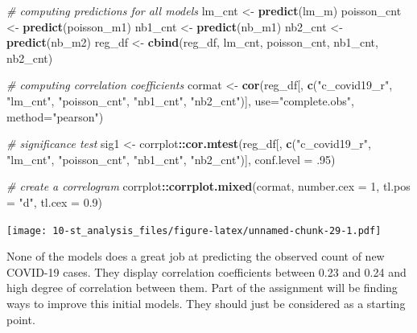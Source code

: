 \documentclass[
]{book}
\newenvironment{Shaded}{\begin{snugshade}}{\end{snugshade}}
\newcommand{\CommentTok}[1]{\textcolor[rgb]{0.56,0.35,0.01}{\textit{#1}}}
\newcommand{\DataTypeTok}[1]{\textcolor[rgb]{0.13,0.29,0.53}{#1}}
\newcommand{\DecValTok}[1]{\textcolor[rgb]{0.00,0.00,0.81}{#1}}
\newcommand{\FloatTok}[1]{\textcolor[rgb]{0.00,0.00,0.81}{#1}}
\newcommand{\KeywordTok}[1]{\textcolor[rgb]{0.13,0.29,0.53}{\textbf{#1}}}
\newcommand{\NormalTok}[1]{#1}
\newcommand{\OperatorTok}[1]{\textcolor[rgb]{0.81,0.36,0.00}{\textbf{#1}}}
\newcommand{\StringTok}[1]{\textcolor[rgb]{0.31,0.60,0.02}{#1}}
\begin{document}
\begin{Shaded}
\begin{Highlighting}[]
\CommentTok{# computing predictions for all models}
\NormalTok{lm_cnt <-}\StringTok{ }\KeywordTok{predict}\NormalTok{(lm_m)}
\NormalTok{poisson_cnt <-}\StringTok{ }\KeywordTok{predict}\NormalTok{(poisson_m1)}
\NormalTok{nb1_cnt <-}\StringTok{ }\KeywordTok{predict}\NormalTok{(nb_m1)}
\NormalTok{nb2_cnt <-}\StringTok{ }\KeywordTok{predict}\NormalTok{(nb_m2)}
\NormalTok{reg_df <-}\StringTok{ }\KeywordTok{cbind}\NormalTok{(reg_df, lm_cnt, poisson_cnt, nb1_cnt, nb2_cnt)}

\CommentTok{# computing correlation coefficients}
\NormalTok{cormat <-}\StringTok{ }\KeywordTok{cor}\NormalTok{(reg_df[, }\KeywordTok{c}\NormalTok{(}\StringTok{"c_covid19_r"}\NormalTok{, }\StringTok{"lm_cnt"}\NormalTok{, }\StringTok{"poisson_cnt"}\NormalTok{, }\StringTok{"nb1_cnt"}\NormalTok{, }\StringTok{"nb2_cnt"}\NormalTok{)], }
              \DataTypeTok{use=}\StringTok{"complete.obs"}\NormalTok{, }
              \DataTypeTok{method=}\StringTok{"pearson"}\NormalTok{)}

\CommentTok{# significance test}
\NormalTok{sig1 <-}\StringTok{ }\NormalTok{corrplot}\OperatorTok{::}\KeywordTok{cor.mtest}\NormalTok{(reg_df[, }\KeywordTok{c}\NormalTok{(}\StringTok{"c_covid19_r"}\NormalTok{, }\StringTok{"lm_cnt"}\NormalTok{, }\StringTok{"poisson_cnt"}\NormalTok{, }\StringTok{"nb1_cnt"}\NormalTok{, }\StringTok{"nb2_cnt"}\NormalTok{)],}
                            \DataTypeTok{conf.level =} \FloatTok{.95}\NormalTok{)}

\CommentTok{# create a correlogram}
\NormalTok{corrplot}\OperatorTok{::}\KeywordTok{corrplot.mixed}\NormalTok{(cormat,}
                         \DataTypeTok{number.cex =} \DecValTok{1}\NormalTok{,}
                         \DataTypeTok{tl.pos =} \StringTok{"d"}\NormalTok{,}
                         \DataTypeTok{tl.cex =} \FloatTok{0.9}\NormalTok{)}
\end{Highlighting}
\end{Shaded}

\texttt{[image: 10-st\_analysis\_files/figure-latex/unnamed-chunk-29-1.pdf]}

None of the models does a great job at predicting the observed count of new COVID-19 cases. They display correlation coefficients between 0.23 and 0.24 and high degree of correlation between them. Part of the assignment will be finding ways to improve this initial models. They should just be considered as a starting point.
\end{document}
